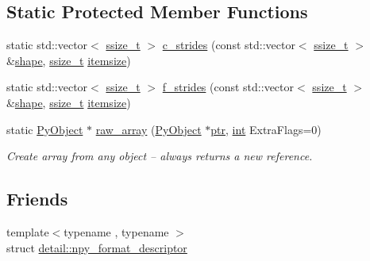 \subsection*{Static Protected Member Functions}
\begin{DoxyCompactItemize}
\item 
static std\+::vector$<$ \mbox{\hyperlink{detail_2common_8h_ac430d16fc097b3bf0a7469cfd09decda}{ssize\+\_\+t}} $>$ \mbox{\hyperlink{classarray_acbcef933c85e97ffafa7f9b2114ffef4}{c\+\_\+strides}} (const std\+::vector$<$ \mbox{\hyperlink{detail_2common_8h_ac430d16fc097b3bf0a7469cfd09decda}{ssize\+\_\+t}} $>$ \&\mbox{\hyperlink{classarray_a084781a3d2cb3ea60ab7bcf16c30ee31}{shape}}, \mbox{\hyperlink{detail_2common_8h_ac430d16fc097b3bf0a7469cfd09decda}{ssize\+\_\+t}} \mbox{\hyperlink{classarray_acd6aa4dba1e1db26fcfd21a323b4d4fa}{itemsize}})
\item 
static std\+::vector$<$ \mbox{\hyperlink{detail_2common_8h_ac430d16fc097b3bf0a7469cfd09decda}{ssize\+\_\+t}} $>$ \mbox{\hyperlink{classarray_a4668d1a96b1acab41acf6f38fa89c122}{f\+\_\+strides}} (const std\+::vector$<$ \mbox{\hyperlink{detail_2common_8h_ac430d16fc097b3bf0a7469cfd09decda}{ssize\+\_\+t}} $>$ \&\mbox{\hyperlink{classarray_a084781a3d2cb3ea60ab7bcf16c30ee31}{shape}}, \mbox{\hyperlink{detail_2common_8h_ac430d16fc097b3bf0a7469cfd09decda}{ssize\+\_\+t}} \mbox{\hyperlink{classarray_acd6aa4dba1e1db26fcfd21a323b4d4fa}{itemsize}})
\item 
static \mbox{\hyperlink{_python27_2object_8h_aadc84ac7aed2cfa6f20c25f62bf3dac7}{Py\+Object}} $\ast$ \mbox{\hyperlink{classarray_a1b059af39c8d296d72f31dcb4952cd4a}{raw\+\_\+array}} (\mbox{\hyperlink{_python27_2object_8h_aadc84ac7aed2cfa6f20c25f62bf3dac7}{Py\+Object}} $\ast$\mbox{\hyperlink{classhandle_afcd412ba4cbffd7d1e3c9338746b2682}{ptr}}, \mbox{\hyperlink{warnings_8h_a74f207b5aa4ba51c3a2ad59b219a423b}{int}} Extra\+Flags=0)
\begin{DoxyCompactList}\small\item\em Create array from any object -- always returns a new reference. \end{DoxyCompactList}\end{DoxyCompactItemize}
\subsection*{Friends}
\begin{DoxyCompactItemize}
\item 
{\footnotesize template$<$typename , typename $>$ }\\struct \mbox{\hyperlink{classarray_a2d7124af4924ef006d3b7bfd42b05085}{detail\+::npy\+\_\+format\+\_\+descriptor}}
\end{DoxyCompactItemize}

